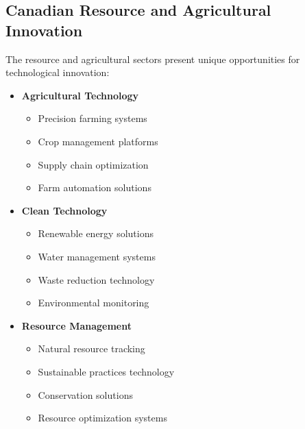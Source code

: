 \subsection{Canadian Resource and Agricultural Innovation}\label{subsec:canadian-resource}

The resource and agricultural sectors present unique opportunities for technological innovation:

\begin{tcolorbox}[colback=white,colframe=primarydark,title=\textbf{Resource and Agriculture Growth Areas}]
\begin{itemize}
    \item \textbf{Agricultural Technology}
    \begin{itemize}
        \item Precision farming systems
        \item Crop management platforms
        \item Supply chain optimization
        \item Farm automation solutions
    \end{itemize}

    \item \textbf{Clean Technology}
    \begin{itemize}
        \item Renewable energy solutions
        \item Water management systems
        \item Waste reduction technology
        \item Environmental monitoring
    \end{itemize}

    \item \textbf{Resource Management}
    \begin{itemize}
        \item Natural resource tracking
        \item Sustainable practices technology
        \item Conservation solutions
        \item Resource optimization systems
    \end{itemize}
\end{itemize}
\end{tcolorbox}


